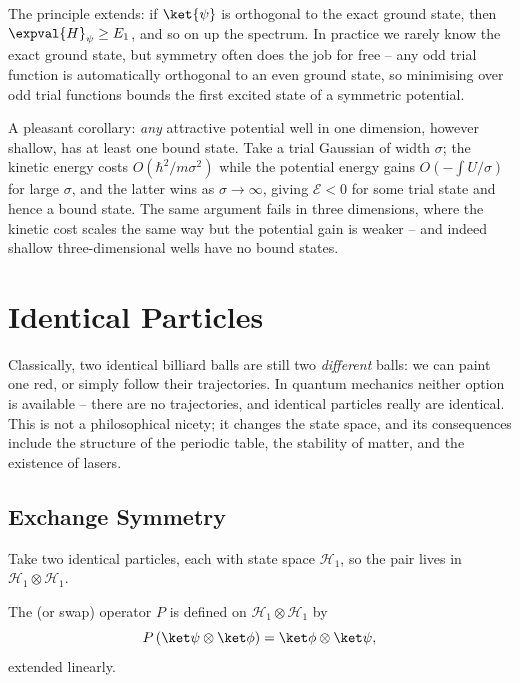 \begin{remark}
    The principle extends: if $\ket{\psi}$ is orthogonal to the exact ground state, then $\expval{H}_\psi \geq E_1$, and so on up the spectrum. In practice we rarely know the exact ground state, but symmetry often does the job for free -- any odd trial function is automatically orthogonal to an even ground state, so minimising over odd trial functions bounds the first excited state of a symmetric potential.
\end{remark}

\begin{remark}
    A pleasant corollary: \emph{any} attractive potential well in one dimension, however shallow, has at least one bound state. Take a trial Gaussian of width $\sigma$; the kinetic energy costs $O(\hbar^2/m\sigma^2)$ while the potential energy gains $O(-\int U/\sigma)$ for large $\sigma$, and the latter wins as $\sigma\to\infty$, giving $\mathcal{E} < 0$ for some trial state and hence a bound state. The same argument fails in three dimensions, where the kinetic cost scales the same way but the potential gain is weaker -- and indeed shallow three-dimensional wells have no bound states.
\end{remark}

\section{Identical Particles}

Classically, two identical billiard balls are still two \emph{different} balls: we can paint one red, or simply follow their trajectories. In quantum mechanics neither option is available -- there are no trajectories, and identical particles really are identical. This is not a philosophical nicety; it changes the state space, and its consequences include the structure of the periodic table, the stability of matter, and the existence of lasers.

\subsection{Exchange Symmetry}

Take two identical particles, each with state space $\mathcal{H}_1$, so the pair lives in $\mathcal{H}_1\otimes\mathcal{H}_1$.

\begin{definition}
    The  (or swap) operator $P$ is defined on $\mathcal{H}_1 \otimes \mathcal{H}_1$ by
    $$
    P\left( \ket\psi \otimes \ket\phi \right) = \ket\phi\otimes\ket\psi,
    $$
    extended linearly.
\end{definition}

